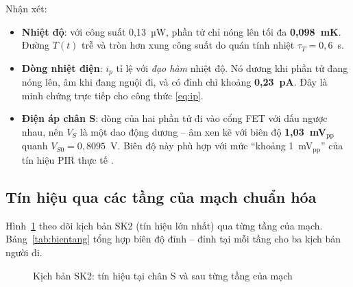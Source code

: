 Nhận xét:
\begin{itemize}
  \item \textbf{Nhiệt độ}: với công suất 0,13~µW, phần tử chỉ nóng lên tối đa \textbf{0,098~mK}. Đường $T(t)$ trễ và tròn hơn xung công suất do quán tính nhiệt $\tau_T = 0{,}6$~s.
  \item \textbf{Dòng nhiệt điện}: $i_p$ tỉ lệ với \emph{đạo hàm} nhiệt độ. Nó dương khi phần tử đang nóng lên, âm khi đang nguội đi, và có đỉnh chỉ khoảng \textbf{0,23~pA}. Đây là minh chứng trực tiếp cho công thức \eqref{eq:ip}.
  \item \textbf{Điện áp chân S}: dòng của hai phần tử đi vào cổng FET với dấu ngược nhau, nên $V_S$ là một dao động dương -- âm xen kẽ với biên độ \textbf{1,03~mV$_\text{pp}$} quanh $V_{S0} = 0{,}8095$~V. Biên độ này phù hợp với mức ``khoảng 1~mV$_\text{pp}$'' của tín hiệu PIR thực tế \cite{st-an4368}.
\end{itemize}

\subsection{Tín hiệu qua các tầng của mạch chuẩn hóa}
\label{sec:kq-tang}

Hình~\ref{fig:sk2stages} theo dõi kịch bản SK2 (tín hiệu lớn nhất) qua từng tầng của mạch. Bảng~\ref{tab:bientang} tổng hợp biên độ đỉnh -- đỉnh tại mỗi tầng cho ba kịch bản người đi.

\begin{figure}[!htb]
\centering
{}
\caption{Kịch bản SK2: tín hiệu tại chân S và sau từng tầng của mạch}
\label{fig:sk2stages}
\end{figure}

